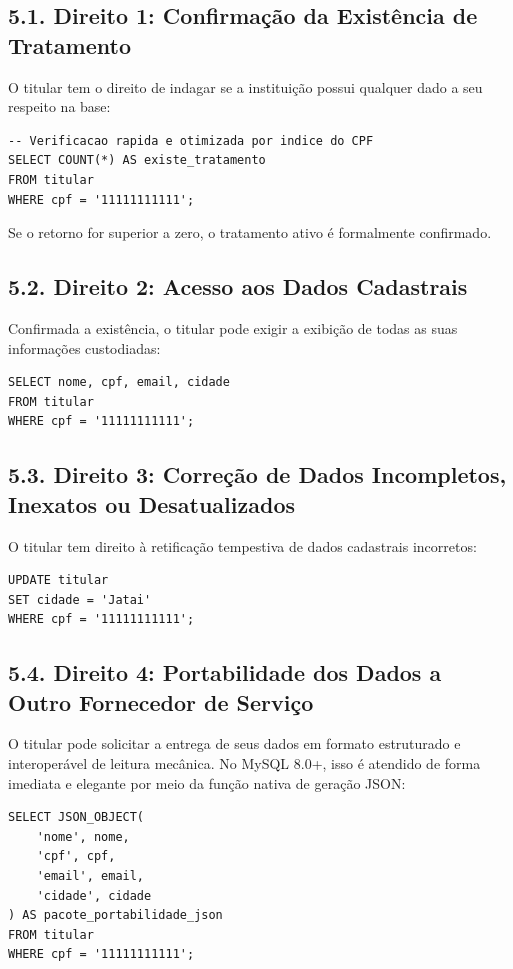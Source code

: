\subsection*{5.1. Direito 1: Confirmação da Existência de Tratamento}

O titular tem o direito de indagar se a instituição possui qualquer dado a seu respeito na base:

\begin{lstlisting}
-- Verificacao rapida e otimizada por indice do CPF
SELECT COUNT(*) AS existe_tratamento
FROM titular
WHERE cpf = '11111111111';
\end{lstlisting}
Se o retorno for superior a zero, o tratamento ativo é formalmente confirmado.

\subsection*{5.2. Direito 2: Acesso aos Dados Cadastrais}

Confirmada a existência, o titular pode exigir a exibição de todas as suas informações custodiadas:

\begin{lstlisting}
SELECT nome, cpf, email, cidade
FROM titular
WHERE cpf = '11111111111';
\end{lstlisting}

\subsection*{5.3. Direito 3: Correção de Dados Incompletos, Inexatos ou Desatualizados}

O titular tem direito à retificação tempestiva de dados cadastrais incorretos:

\begin{lstlisting}
UPDATE titular
SET cidade = 'Jatai'
WHERE cpf = '11111111111';
\end{lstlisting}

\subsection*{5.4. Direito 4: Portabilidade dos Dados a Outro Fornecedor de Serviço}

O titular pode solicitar a entrega de seus dados em formato estruturado e interoperável de leitura mecânica. No MySQL 8.0+, isso é atendido de forma imediata e elegante por meio da função nativa de geração JSON:

\begin{lstlisting}
SELECT JSON_OBJECT(
    'nome', nome,
    'cpf', cpf,
    'email', email,
    'cidade', cidade
) AS pacote_portabilidade_json
FROM titular
WHERE cpf = '11111111111';
\end{lstlisting}

